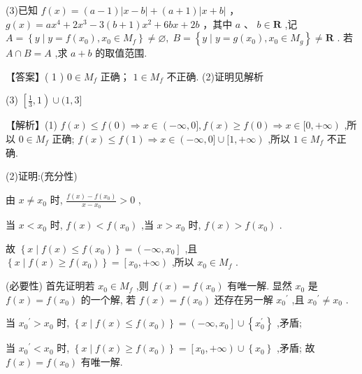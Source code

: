 \documentclass[10pt]{article}
\begin{document}
(3)已知 \(f\left( x\right)  = \left( {a - 1}\right) \left| {x - b}\right|  + \left( {a + 1}\right) \left| {x + b}\right|\) ， \(g\left( x\right)  = a{x}^{4} + 2{x}^{3} - 3\left( {b + 1}\right) {x}^{2} + {6bx} + {2b}\) ，其中 \(a\text{ 、 }b \in  \mathbf{R}\) ,记 \(A = \left\{  {y \mid  y = f\left( {x}_{0}\right) ,{x}_{0} \in  {M}_{f}}\right\}   \neq  \varnothing ,\;B = \left\{  {y \mid  y = g\left( {x}_{0}\right) ,{x}_{0} \in  {M}_{g}}\right\}   \neq  \mathbf{R}\) . 若 \(A \cap  B = A\) ,求 \(a + b\) 的取值范围.

【答案】( 1 ) \(0 \in  {M}_{f}\) 正确； \(1 \in  {M}_{f}\) 不正确. (2)证明见解析

(3) \(\left\lbrack  {\frac{1}{3},1}\right)  \cup  (1,3\rbrack\)

【解析】(1) \(f\left( x\right)  \leq  f\left( 0\right)  \Rightarrow  x \in  ( - \infty ,0\rbrack ,f\left( x\right)  \geq  f\left( 0\right)  \Rightarrow  x \in  \lbrack 0, + \infty )\) ,所以 \(0 \in  {M}_{f}\) 正确; \(f\left( x\right)  \leq  f\left( 1\right)  \Rightarrow  x \in  \left( {-\infty ,0\rbrack \cup \lbrack 1, + \infty }\right)\) ,所以 \(1 \in  {M}_{f}\) 不正确.

(2)证明:(充分性)

由 \(x \neq  {x}_{0}\) 时, \(\frac{f\left( x\right)  - f\left( {x}_{0}\right) }{x - {x}_{0}} > 0\) ,

当 \(x < {x}_{0}\) 时, \(f\left( x\right)  < f\left( {x}_{0}\right)\) ,当 \(x > {x}_{0}\) 时, \(f\left( x\right)  > f\left( {x}_{0}\right)\) .

故 \(\left\{  {x \mid  f\left( x\right)  \leq  f\left( {x}_{0}\right) }\right\}   = \left( {-\infty ,{x}_{0}}\right\rbrack\) ,且 \(\left\{  {x \mid  f\left( x\right)  \geq  f\left( {x}_{0}\right) }\right\}   = \left\lbrack  {{x}_{0}, + \infty }\right)\) ,所以 \({x}_{0} \in  {M}_{f}\) .

(必要性) 首先证明若 \({x}_{0} \in  {M}_{f}\) ,则 \(f\left( x\right)  = f\left( {x}_{0}\right)\) 有唯一解. 显然 \({x}_{0}\) 是 \(f\left( x\right)  = f\left( {x}_{0}\right)\) 的一个解, 若 \(f\left( x\right)  = f\left( {x}_{0}\right)\) 还存在另一解 \({x}_{0}{}^{\prime }\) ,且 \({x}_{0}{}^{\prime } \neq  {x}_{0}\) .

当 \({x}_{0}{}^{\prime } > {x}_{0}\) 时, \(\left\{  {x \mid  f\left( x\right)  \leq  f\left( {x}_{0}\right) }\right\}   = \left( {-\infty ,{x}_{0}}\right\rbrack   \cup  \left\{  {x}_{0}^{\prime }\right\}\) ,矛盾;

当 \({x}_{0}{}^{\prime } < {x}_{0}\) 时, \(\left\{  {x \mid  f\left( x\right)  \geq  f\left( {x}_{0}\right) }\right\}   = \left\lbrack  {{x}_{0}, + \infty }\right)  \cup  \left\{  {x}_{0}\right\}\) ,矛盾; 故 \(f\left( x\right)  = f\left( {x}_{0}\right)\) 有唯一解.
\end{document}
